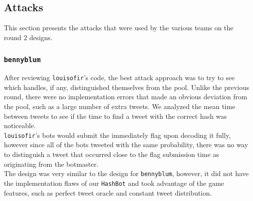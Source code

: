 \documentclass[11pt, oneside]{article} %
\numberwithin{equation}{section} %
\numberwithin{figure}{section} %
\numberwithin{table}{section} %
\renewcommand{\c}[1]{\texttt{#1}}
\newcommand{\teambb}{\c{bennyblum}}
\newcommand{\teamol}{\c{louisofir}}
\begin{document}
	\subsection{Attacks}
		This section presents the attacks that were used by the various teams on the round 2 designs.

		\subsubsection{\teambb{}}

		After reviewing \teamol's code, the best attack approach was to try to see which handles, if any, distinguished themselves from the pool. Unlike the previous round, there were no implementation errors that made an obvious deviation from the pool, such as a large number of extra tweets. We analyzed the mean time between tweets to see if the time to find a tweet with the correct hash was noticeable. \\

		\teamol's bots would submit the immediately flag upon decoding it fully, however since all of the bots tweeted with the same probability, there was no way to distinguish a tweet that occurred close to the flag submission time as originating from the botmaster. \\

		The design was very similar to the design for \teambb, however, it did not have the implementation flaws of our \c{HashBot} and took advantage of the game features, such as perfect tweet oracle and constant tweet distribution. 
\end{document}
